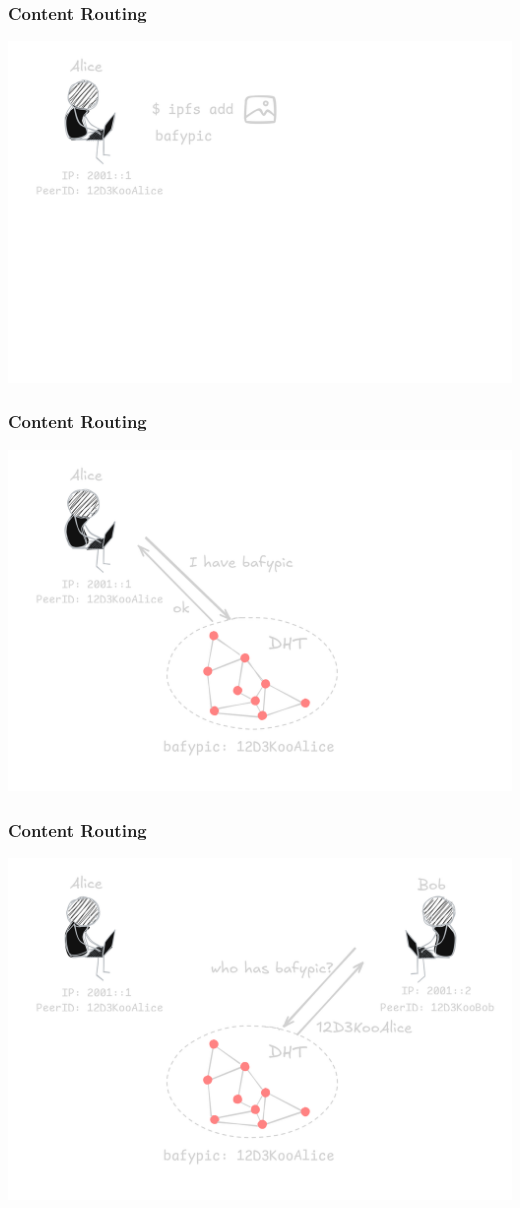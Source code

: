 \documentclass{../shipyard-slide}
\begin{document}
\begin{frame}
  \frametitle{Content Routing}
  \begin{center}
    \includegraphics[width=.7\textwidth]{resources/routing-add.png}
  \end{center}
\end{frame}
\begin{frame}
  \frametitle{Content Routing}
  \begin{center}
    \includegraphics[width=.7\textwidth]{resources/routing-provide.png}
  \end{center}
\end{frame}
\begin{frame}
  \frametitle{Content Routing}
  \begin{center}
    \includegraphics[width=.7\textwidth]{resources/routing-lookup-bob.png}
  \end{center}
\end{frame}
\end{document}
